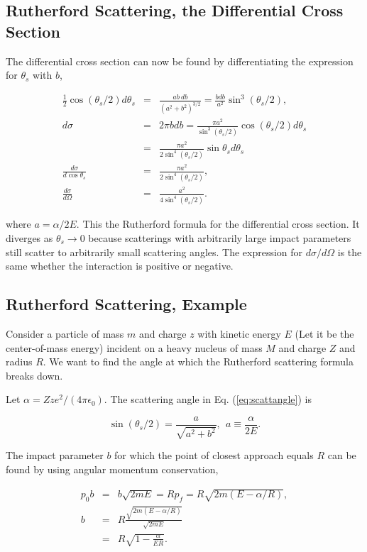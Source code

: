 \documentclass[%
oneside,                 %
final,                   %
10pt]{article}
\begin{document}
\subsection{Rutherford Scattering, the Differential Cross Section}

The differential cross section can now be found by differentiating the
expression for $\theta_s$ with $b$,

\begin{eqnarray}
\label{eq:rutherford}
\frac{1}{2}\cos(\theta_s/2)d\theta_s&=&\frac{ab~db}{(a^2+b^2)^{3/2}}=\frac{bdb}{a^2}\sin^3(\theta_s/2),\\
\nonumber
d\sigma&=&2\pi bdb=\frac{\pi a^2}{\sin^3(\theta_s/2)}\cos(\theta_s/2)d\theta_s\\
\nonumber
&=&\frac{\pi a^2}{2\sin^4(\theta_s/2)}\sin\theta_s d\theta_s\\
\nonumber
\frac{d\sigma}{d\cos\theta_s}&=&\frac{\pi a^2}{2\sin^4(\theta_s/2)},\\
\nonumber
\frac{d\sigma}{d\Omega}&=&\frac{a^2}{4\sin^4(\theta_s/2)}.
\end{eqnarray}

where $a= \alpha/2E$. This the Rutherford formula for the differential
cross section. It diverges as $\theta_s\rightarrow 0$ because
scatterings with arbitrarily large impact parameters still scatter to
arbitrarily small scattering angles. The expression for
$d\sigma/d\Omega$ is the same whether the interaction is positive or
negative.

\subsection{Rutherford Scattering, Example}

Consider a particle of mass $m$ and charge $z$ with kinetic energy $E$
(Let it be the center-of-mass energy) incident on a heavy nucleus of
mass $M$ and charge $Z$ and radius $R$. We want to find the angle at which the
Rutherford scattering formula breaks down.

Let $\alpha=Zze^2/(4\pi\epsilon_0)$. The scattering angle in Eq. (\ref{eq:scattangle}) is 

\[
\sin(\theta_s/2)=\frac{a}{\sqrt{a^2+b^2}}, ~~a\equiv \frac{\alpha}{2E}.
\]

The impact parameter $b$ for which the point of closest approach
equals $R$ can be found by using angular momentum conservation,

\begin{eqnarray*}
p_0b&=&b\sqrt{2mE}=Rp_f=R\sqrt{2m(E-\alpha/R)},\\
b&=&R\frac{\sqrt{2m(E-\alpha/R)}}{\sqrt{2mE}}\\
&=&R\sqrt{1-\frac{\alpha}{ER}}.
\end{eqnarray*}
\end{document}
